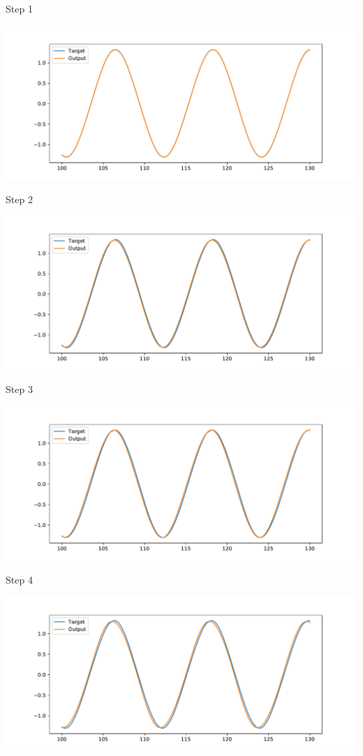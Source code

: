 \documentclass[presentation]{beamer}
\begin{document}
\begin{frame}[label={sec:org1ecc7e2}]{Step 1}
\begin{center}
\includegraphics[width=.9\linewidth]{./step1.pdf}
\end{center}
\end{frame}
\begin{frame}[label={sec:org1a82c13}]{Step 2}
\begin{center}
\includegraphics[width=.9\linewidth]{./step2.pdf}
\end{center}
\end{frame}
\begin{frame}[label={sec:org1d1371d}]{Step 3}
\begin{center}
\includegraphics[width=.9\linewidth]{./step3.pdf}
\end{center}
\end{frame}
\begin{frame}[label={sec:orgd86f374}]{Step 4}
\begin{center}
\includegraphics[width=.9\linewidth]{./step4.pdf}
\end{center}
\end{frame}
\end{document}
